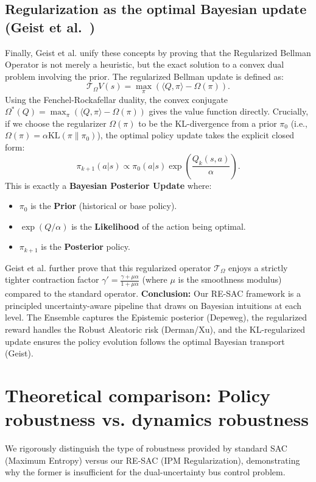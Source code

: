 \subsection{Regularization as the optimal Bayesian update (Geist et al.~\cite{Geist2019TheoryRegularized})}
Finally, Geist et al. unify these concepts by proving that the Regularized Bellman Operator is not merely a heuristic, but the exact solution to a convex dual problem involving the prior.
The regularized Bellman update is defined as:
\begin{equation}
    \mathcal{T}_\Omega V(s) = \max_\pi \left( \langle Q, \pi \rangle - \Omega(\pi) \right).
\end{equation}
Using the Fenchel-Rockafellar duality, the convex conjugate $\Omega^*(Q) = \max_\pi (\langle Q, \pi \rangle - \Omega(\pi))$ gives the value function directly.
Crucially, if we choose the regularizer $\Omega(\pi)$ to be the KL-divergence from a prior $\pi_0$ (i.e., $\Omega(\pi) = \alpha \text{KL}(\pi \| \pi_0)$), the optimal policy update takes the explicit closed form:
\begin{equation}
    \pi_{k+1}(a|s) \propto \pi_0(a|s) \exp\left( \frac{Q_k(s,a)}{\alpha} \right).
\end{equation}
This is exactly a \textbf{Bayesian Posterior Update} where:
\begin{itemize}
    \item $\pi_0$ is the \textbf{Prior} (historical or base policy).
    \item $\exp(Q/\alpha)$ is the \textbf{Likelihood} of the action being optimal.
    \item $\pi_{k+1}$ is the \textbf{Posterior} policy.
\end{itemize}
Geist et al. further prove that this regularized operator $\mathcal{T}_\Omega$ enjoys a strictly tighter contraction factor $\gamma' = \frac{\gamma + \mu \alpha}{1 + \mu \alpha}$ (where $\mu$ is the smoothness modulus) compared to the standard operator.
\textbf{Conclusion:} Our RE-SAC framework is a principled uncertainty-aware pipeline that draws on Bayesian intuitions at each level. The Ensemble captures the Epistemic posterior (Depeweg), the regularized reward handles the Robust Aleatoric risk (Derman/Xu), and the KL-regularized update ensures the policy evolution follows the optimal Bayesian transport (Geist).

\section{Theoretical comparison: Policy robustness vs. dynamics robustness}
\label{app:sac_vs_resac}
We rigorously distinguish the type of robustness provided by standard SAC (Maximum Entropy) versus our RE-SAC (IPM Regularization), demonstrating why the former is insufficient for the dual-uncertainty bus control problem.

